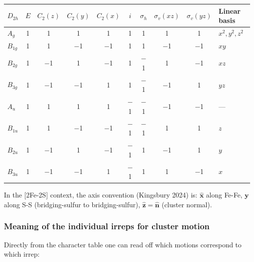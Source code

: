 \documentclass[11pt,a4paper,twoside]{article}
\theoremstyle{remark}
\begin{document}
\begin{center}
\begin{tabular}{lccccccccl}
  \toprule
  \textbf{$D_{2h}$} & $E$ & $C_2(z)$ & $C_2(y)$ & $C_2(x)$ &
                     $i$ & $\sigma_h$ & $\sigma_v(xz)$ & $\sigma_v(yz)$ &
                     \textbf{Linear basis} \\
  \midrule
  $A_g$    & 1 & 1 & 1 & 1 & 1 & 1 & 1 & 1 & $x^2, y^2, z^2$ \\
  $B_{1g}$ & 1 & 1 & $-$1 & $-$1 & 1 & 1 & $-$1 & $-$1 & $xy$ \\
  $B_{2g}$ & 1 & $-$1 & 1 & $-$1 & 1 & $-$1 & 1 & $-$1 & $xz$ \\
  $B_{3g}$ & 1 & $-$1 & $-$1 & 1 & 1 & $-$1 & $-$1 & 1 & $yz$ \\
  $A_u$    & 1 & 1 & 1 & 1 & $-$1 & $-$1 & $-$1 & $-$1 & --- \\
  $B_{1u}$ & 1 & 1 & $-$1 & $-$1 & $-$1 & $-$1 & 1 & 1 & $z$ \\
  $B_{2u}$ & 1 & $-$1 & 1 & $-$1 & $-$1 & 1 & $-$1 & 1 & $y$ \\
  $B_{3u}$ & 1 & $-$1 & $-$1 & 1 & $-$1 & 1 & 1 & $-$1 & $x$ \\
  \bottomrule
\end{tabular}
\end{center}

In the [2Fe-2S] context, the axis convention (Kingsbury 2024) is:
$\hat{\mathbf{x}}$ along Fe-Fe, $\hat{\mathbf{y}}$ along S-S
(bridging-sulfur to bridging-sulfur),
$\hat{\mathbf{z}} = \hat{\mathbf{n}}$ (cluster normal).

\subsubsection*{Meaning of the individual irreps for cluster motion}

Directly from the character table one can read off which motions
correspond to which irrep:
\end{document}
